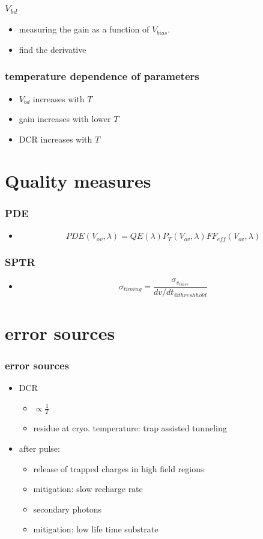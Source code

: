 \documentclass{beamer}
\begin{document}
\begin{frame}
  \frametitle{$V_{bd}$}
  \begin{itemize}
    \item measuring the gain as a function of $V_{bias}$.
    \item find the derivative
  \end{itemize}
\end{frame}

\begin{frame}
  \frametitle{temperature dependence of parameters}
  \begin{itemize}
    \item $V_{bd}$ increases with $T$
    \item gain increases with lower $T$
    \item DCR increases with $T$
  \end{itemize}
\end{frame}


\section{Quality measures}
\begin{frame}
  \frametitle{PDE}
  \begin{itemize}
    \item 
      \[PDE(V_{ov},\lambda)=QE(\lambda)P_T(V_{ov},\lambda)FF_{eff}(V_{ov},\lambda)\]
  \end{itemize}
\end{frame}

\begin{frame}
  \frametitle{SPTR}
  \begin{itemize}
    \item 
      \[\sigma_{timing}=\frac{\sigma_{v_{voise}}}{dv/dt_{@threshhold}}\]
  \end{itemize}
\end{frame}

\section{error sources}
\begin{frame}
  \frametitle{error sources}
  \begin{itemize}
    \item DCR
    \begin{itemize}
      \item $\propto\frac{1}{T}$
      \item residue at cryo. temperature: trap assisted tunneling
    \end{itemize}
    \item after pulse:
    \begin{itemize}
      \item release of trapped charges in high field regions
      \item mitigation: slow recharge rate
      \item secondary photons
      \item mitigation: low life time substrate
    \end{itemize}
  \end{itemize}
\end{frame}
\end{document}
